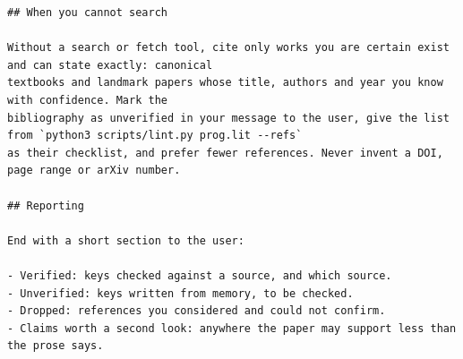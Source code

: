 \documentclass[10pt,a4paper]{article}
\begin{document}
\begin{Verbatim}
## When you cannot search

Without a search or fetch tool, cite only works you are certain exist and can state exactly: canonical
textbooks and landmark papers whose title, authors and year you know with confidence. Mark the
bibliography as unverified in your message to the user, give the list from `python3 scripts/lint.py prog.lit --refs`
as their checklist, and prefer fewer references. Never invent a DOI, page range or arXiv number.

## Reporting

End with a short section to the user:

- Verified: keys checked against a source, and which source.
- Unverified: keys written from memory, to be checked.
- Dropped: references you considered and could not confirm.
- Claims worth a second look: anywhere the paper may support less than the prose says.
\end{Verbatim}
\end{document}
